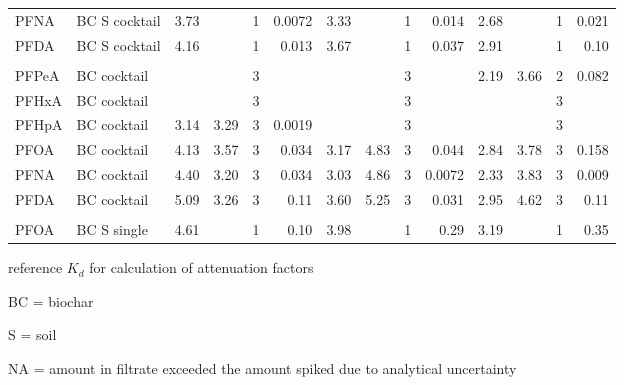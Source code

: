 \begin{table}[h]
{\begin{threeparttable}
\begin{tabular}{llrrrrrrrrrrrr}
PFNA & BC S  cocktail & 3.73 &  & 1 & 0.0072 & 3.33 &  & 1 & 0.014 & 2.68 &  & 1 & 0.021 \\
PFDA & BC S  cocktail & 4.16 &  & 1 & 0.013 & 3.67 &  & 1 & 0.037 & 2.91 &  & 1 & 0.10 \\
 &  &  &  &  &  &  &  &  &  &  &  &  &  \\
PFPeA & BC  cocktail &  &  & 3 &  &  &  & 3 &  & 2.19 & 3.66 & 2 & 0.082 \\
PFHxA & BC  cocktail &  &  & 3 &  &  &  & 3 &  &  &  & 3 &  \\
PFHpA & BC  cocktail & 3.14 & 3.29 & 3 & 0.0019 &  &  & 3 &  &  &  & 3 &  \\
PFOA & BC  cocktail & 4.13 & 3.57 & 3 & 0.034 & 3.17 & 4.83 & 3 & 0.044 & 2.84 & 3.78 & 3 & 0.158 \\
PFNA & BC  cocktail & 4.40 & 3.20 & 3 & 0.034 & 3.03 & 4.86 & 3 & 0.0072 & 2.33 & 3.83 & 3 & 0.009 \\
PFDA & BC  cocktail & 5.09 & 3.26 & 3 & 0.11 & 3.60 & 5.25 & 3 & 0.031 & 2.95 & 4.62 & 3 & 0.11 \\
 &  &  &  &  &  &  &  &  &  &  &  &  &  \\
PFOA & BC S single & 4.61 &  & 1 & 0.10 & 3.98 &  & 1 & 0.29 & 3.19 &  & 1 & 0.35 \\ \bottomrule
\end{tabular}
\begin{tablenotes}
\item * reference $K_d$ for calculation of attenuation factors
\item BC = biochar
\item S = soil
\item NA = amount in filtrate exceeded the amount spiked due to analytical uncertainty
\end{tablenotes}
\end{threeparttable}}
\end{table}


